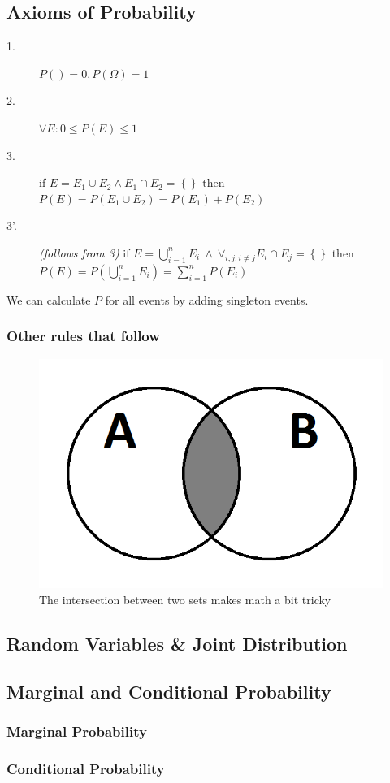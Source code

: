 \subsection{Axioms of Probability}
\begin{description}
	\item[1.] $P({}) = 0, P(\Omega) = 1$
  \item[2.] $\forall E: 0 \leq P(E) \leq 1$
  \item[3.] if $E = E_1 \cup E_2 \wedge E_1 \cap E_2 = \left\{ \right\}$ 
            then $P(E) = P(E_1 \cup E_2) = P(E_1) + P(E_2)$
  \item[3'.] \textit{(follows from 3)} 
            if $E = \bigcup_{i=1}^n E_i \  \wedge \ \forall_{i, j; i \neq j} E_i \cap E_j = \left\{ \right\}$
            then $P(E) = P(\bigcup_{i=1}^n E_i) = \sum_{i=1}^{n}{P(E_i)}$
\end{description}

We can calculate $P$ for all events by adding singleton events.

\subsubsection*{Other rules that follow}
\begin{figure}[ht]
\includegraphics[scale=0.2]{venn_diagram_a_intersects_b}
\caption{The intersection between two sets makes math a bit tricky}
\label{fig:venn_a_inter_b}
\end{figure}



\subsection{Random Variables \& Joint Distribution}


\subsection{Marginal and Conditional Probability}


\subsubsection*{Marginal Probability}


\subsubsection*{Conditional Probability}